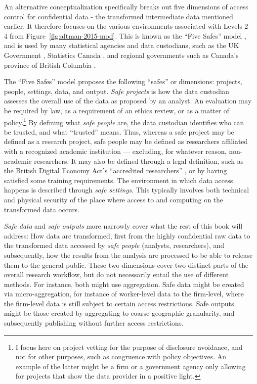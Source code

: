 An alternative conceptualization specifically breaks out five dimensions of access control for confidential data - the transformed intermediate data mentioned earlier. It therefore focuses on the various environments associated with Levels 2-4 from Figure~\ref{fig:altman-2015-mod}. This is known as the ``Five Safes'' model \cite{desai_five_2016}, and is used by many statistical agencies and data custodians, such as the UK Government \cite{uk_government_digital_2020}, Statistics Canada \cite{statistics_canada_information_2018}, and regional governments such as Canada's province of British Columbia \cite{bc_ministry_of_citizens_services_privacy_nodate}.

The ``Five Safes'' model proposes the following ``safes'' or dimensions:  projects,  people,  settings, data, and output. \textit{Safe projects} is how the data custodian assesses the overall use of the data as proposed by an analyst. An evaluation may be required by law, as a requirement of an ethics review, or as a matter of policy.\footnote{I focus here on project vetting for the purpose of disclosure avoidance, and not for other purposes, such as congruence with policy objectives. An example of the latter might be a firm or a government agency only allowing for projects that show the data provider in a positive light.} By defining what \textit{safe people} are, the data custodian identifies who can be trusted, and what ``trusted'' means. Thus, whereas a safe project may be defined as a research project, safe people may be defined as researchers affiliated with a recognized academic institution --- excluding, for whatever reason, non-academic researchers. It may also be defined through a legal definition, such as the British Digital Economy Act's ``accredited researchers'' \cite{uk_government_digital_2020}, or by having satisfied some training requirements. 
The environment in which data access happens is described through \textit{safe settings}. This typically involves both technical and physical security of the place where access to and computing on the transformed data occurs. 

\textit{Safe data} and \textit{safe outputs} more narrowly cover what the rest of this book will address: How data are transformed, first from the highly confidential raw data to the transformed data accessed by \textit{safe people} (analysts, researchers), and subsequently, how the results from the analysis are processed to be able to release them to the general public. These two dimensions cover two distinct parts of the overall research workflow, but do not necessarily entail the use of different methods. For instance, both might use aggregation. Safe data might be created via micro-aggregation, for instance of worker-level data to the firm-level, where the firm-level data is still subject to certain access restrictions. Safe outputs might be those created by aggregating to coarse geographic granularity, and subsequently publishing without further access restrictions. 

